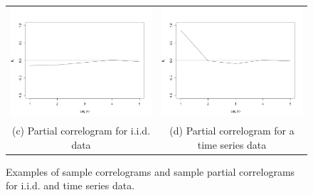 \begin{itemize}
\begin{figure}[ht!]
\begin{center}
\begin{tabular}{cc}
\includegraphics[scale=0.25]{./figures/PartialCorrelogramGaussian} &
\includegraphics[scale=0.25]{./figures/PartialCorrelogramTimeSerie} \\
\small (c) Partial correlogram for i.i.d. data & (d) \small Partial correlogram for a time series data \\
\end{tabular}
\caption{\label{Figure:PreliminariesCorrelograms} Examples of sample correlograms and sample partial correlograms for i.i.d. and time series data. 
}
\end{center}
\end{figure}

\end{itemize}

